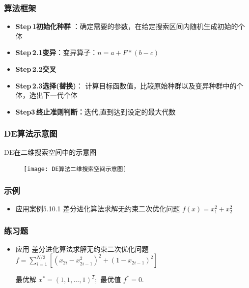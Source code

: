 \documentclass[handout]{beamer}
\begin{document}
		
		
\begin{frame}
			\frametitle{算法框架}
			\begin{itemize}
					\item 
\textbf{Step\,1初始化种群} ：确定需要的参数，在给定搜索区间内随机生成初始的个体

	\item
\textbf{Step\,2.1变异}：变异算子：$n=a+F *(b-c)$ 

	\item \textbf{Step\,2.2交叉} 

	\item
\textbf{Step\,2.3选择(替换)}：
计算目标函数值，比较原始种群以及变异种群中的个体，选出下一代个体  \\

	\item \textbf{Step3\,终止准则判断：}迭代,直到达到设定的最大代数
			\end{itemize}
\end{frame}
		
\begin{frame}
	\frametitle{DE算法示意图}	
	DE在二维搜索空间中的示意图
	\begin{figure}[htbp]
		\centering
		\texttt{[image: DE算法二维搜索空间示意图]}
		
	\end{figure}
\end{frame}
\begin{frame}
			\frametitle{示例}
			\begin{itemize}
				\item 应用案例5.10.1   差分进化算法求解无约束二次优化问题   $f(x)=x_{1}^{2}+x_{2}^{2}$
				
			
			\end{itemize}
\end{frame}
		
				\begin{frame}
			\frametitle{练习题}
			\begin{itemize}
				\item 应用   差分进化算法求解无约束二次优化问题     $  f=\sum_{i=1}^{N / 2}\left[\left(x_{2 i}-x_{2 i-1}^{2}\right)^{2}+\left(1-x_{2 i-1}\right)^{2}\right]$
				
				
				最优解  $x^{*}=(1,1, \ldots, 1)^{T} ;$
				最优值  $f^{*}=0$.
				
				
			\end{itemize}
		\end{frame}
		
	
	
\end{document}
